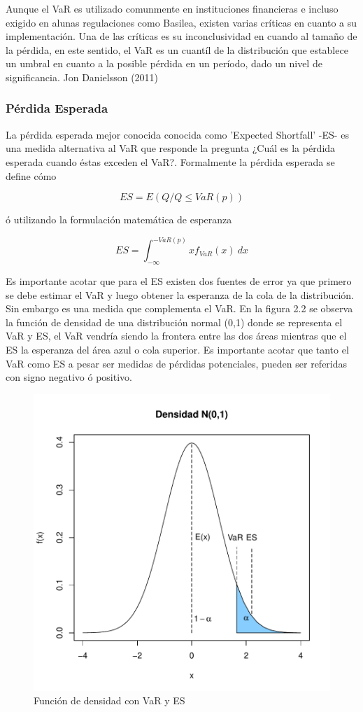 \documentclass[a4paper,12pt]{Latex/Classes/PhDthesisPSnPDF}
\begin{document}
Aunque el VaR es utilizado comunmente en instituciones financieras e incluso exigido en alunas regulaciones como Basilea, existen varias críticas en cuanto a su implementación. Una de las críticas es su inconclusividad en cuando al tamaño de la pérdida, en este sentido, el VaR es un cuantíl de la distribución que establece un umbral en cuanto a la posible pérdida en un período, dado un nivel de significancia. Jon Danielsson (2011)

\subsubsection{Pérdida Esperada}

La pérdida esperada mejor conocida conocida como 'Expected Shortfall' -ES- es una medida alternativa al VaR que responde la pregunta ¿Cuál es la pérdida esperada cuando éstas exceden el VaR?. Formalmente la pérdida esperada se define cómo

$$ ES = E(Q/Q \leq VaR(p)) $$ 

ó utilizando la formulación matemática de esperanza

$$ ES = \int_{-\infty}^{-VaR(p)} xf_{VaR}(x)\ dx $$

Es importante acotar que para el ES existen dos fuentes de error ya que primero se debe estimar el VaR y luego obtener la esperanza de la cola de la distribución. Sin embargo es una medida que complementa el VaR. En la figura 2.2 se observa la función de densidad de una distribución normal (0,1) donde se representa el VaR y ES, el VaR vendría siendo la frontera entre las dos áreas mientras que el ES la esperanza del área azul o cola superior.
Es importante acotar que tanto el VaR como ES a pesar ser medidas de pérdidas potenciales, pueden ser referidas con signo negativo ó positivo.

\begin{figure}[H]
\centering
\includegraphics{main-001}
\caption{Función de densidad con VaR y ES}
\end{figure}
\end{document}
